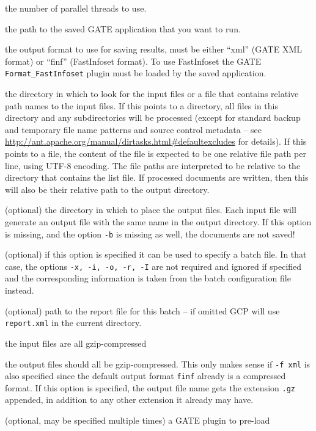 \bde
\item[-t] the number of parallel threads to use.
\item[-x] the path to the saved GATE application that you want to run.
\item[-f] the output format to use for saving results, must be either ``xml''
  (GATE XML format) or ``finf'' (FastInfoset format).  To use FastInfoset the
  GATE \verb!Format_FastInfoset! plugin must be loaded by the saved
  application.
\item[-i] the directory in which to look for the input files or a file that contains
  relative path names to the input files. If this points to a directory, all files in
  this directory and any subdirectories will be processed (except for standard
  backup and temporary file name patterns and source control metadata -- see
  \url{http://ant.apache.org/manual/dirtasks.html#defaultexcludes} for
  details). If this points to a file, the content of the file is expected to be 
  one relative file path per line, using UTF-8 encoding. The file paths are 
  interpreted to be relative to the directory that contains the list file.
  If processed documents are written, then this will also be their relative 
  path to the output directory. 
\item[-o] (optional) the directory in which to place the output files.  Each input file
  will generate an output file with the same name in the output directory.
  If this option is missing, and the option \texttt{-b} is missing as well,
  the documents are not saved!
\item[-b] (optional) if this option is specified it can be used to specify
  a batch file. In that case, the options \texttt{-x, -i, -o, -r, -I} are 
  not required and ignored if specified and the corresponding information is
  taken from the batch configuration file instead.
\item[-r] (optional) path to the report file for this batch -- if omitted
  GCP will use \verb!report.xml! in the current directory.
\item[-ci] the input files are all gzip-compressed
\item[-co] the output files should all be gzip-compressed. This only makes
sense if \verb!-f xml! is also specified since the default output format
\verb!finf! already is a compressed format. If this option is specified, the
output file name gets the extension \verb!.gz! appended, in addition to 
any other extension it already may have.
\item[-p] (optional, may be specified multiple times) a GATE plugin to pre-load
